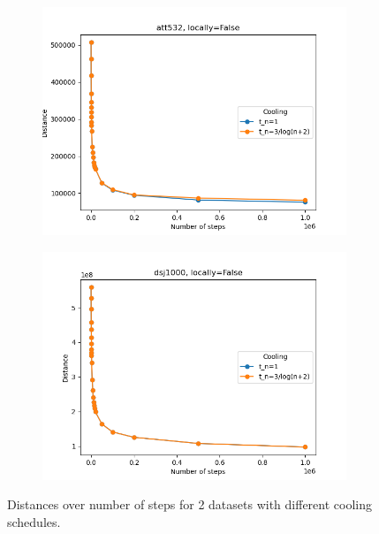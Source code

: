 \begin{figure}[!htb]
	\centering
	\begin{subfigure}{0.45\textwidth}
		\includegraphics[width=\textwidth]{img/att532_annealing_locally=False}
	\end{subfigure}
	\begin{subfigure}{0.45\textwidth}
		\includegraphics[width=\textwidth]{img/dsj1000_annealing_locally=False}
	\end{subfigure}
	\caption{Distances over number of steps for 2 datasets with different cooling schedules.}
	\label{fig:annealing_2}
\end{figure}
